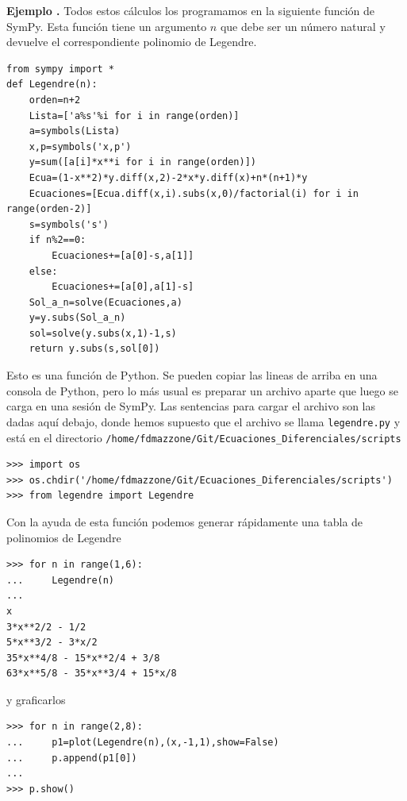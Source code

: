 \documentclass{article}
\newcounter{ejemplo_cont}
\newenvironment{ejemplo}{\noindent\textbf{Ejemplo  \arabic{ejemplo_cont}.} }{\addtocounter{ejemplo_cont}{1}}
\begin{document}
\begin{ejemplo}
Todos estos cálculos los programamos en la siguiente función de SymPy. Esta función tiene un argumento $n$ que debe ser un número natural y devuelve el correspondiente polinomio de Legendre.


\begin{lstlisting}
from sympy import *
def Legendre(n):
    orden=n+2
    Lista=['a%s'%i for i in range(orden)]
    a=symbols(Lista)
    x,p=symbols('x,p')
    y=sum([a[i]*x**i for i in range(orden)])
    Ecua=(1-x**2)*y.diff(x,2)-2*x*y.diff(x)+n*(n+1)*y
    Ecuaciones=[Ecua.diff(x,i).subs(x,0)/factorial(i) for i in range(orden-2)]       
    s=symbols('s')
    if n%2==0:
        Ecuaciones+=[a[0]-s,a[1]]
    else:
        Ecuaciones+=[a[0],a[1]-s]
    Sol_a_n=solve(Ecuaciones,a)
    y=y.subs(Sol_a_n)
    sol=solve(y.subs(x,1)-1,s)
    return y.subs(s,sol[0])
\end{lstlisting}

Esto es una función de Python. Se pueden copiar las lineas de arriba en una consola de Python, pero lo más usual es preparar un archivo aparte que luego se carga en una sesión de SymPy.  Las sentencias para cargar el archivo son las dadas aquí debajo, donde hemos supuesto que el archivo se llama \texttt{legendre.py} y está en el directorio \texttt{/home/fdmazzone/Git/Ecuaciones\_Diferenciales/scripts}

\begin{lstlisting}
>>> import os
>>> os.chdir('/home/fdmazzone/Git/Ecuaciones_Diferenciales/scripts')
>>> from legendre import Legendre
\end{lstlisting}


Con la ayuda de esta función podemos generar rápidamente una tabla de polinomios de Legendre
\begin{lstlisting}
>>> for n in range(1,6):
...     Legendre(n)
... 
x
3*x**2/2 - 1/2
5*x**3/2 - 3*x/2
35*x**4/8 - 15*x**2/4 + 3/8
63*x**5/8 - 35*x**3/4 + 15*x/8
\end{lstlisting}
y graficarlos
\begin{lstlisting}
>>> for n in range(2,8):
...     p1=plot(Legendre(n),(x,-1,1),show=False)
...     p.append(p1[0])
... 
>>> p.show()
\end{lstlisting}



\end{ejemplo}
\end{document}
